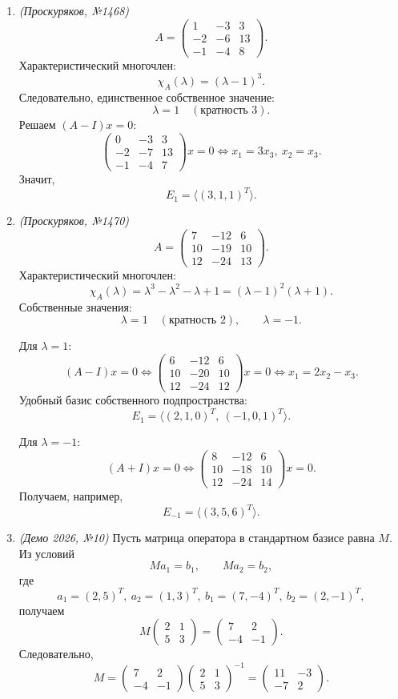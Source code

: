 \begin{enumerate}
\item \textit{(Проскуряков, №1468)}
\[
A=\begin{pmatrix}
1&-3&3\\
-2&-6&13\\
-1&-4&8
\end{pmatrix}.
\]
Характеристический многочлен:
\[
\chi_A(\lambda)=(\lambda-1)^3.
\]
Следовательно, единственное собственное значение:
\[
\lambda=1 \quad (\text{кратность }3).
\]
Решаем \((A-I)x=0\):
\[
\begin{pmatrix}
0&-3&3\\
-2&-7&13\\
-1&-4&7
\end{pmatrix}x=0
\iff x_1=3x_3,\ x_2=x_3.
\]
Значит,
\[
E_1=\langle (3,1,1)^T\rangle.
\]

\item \textit{(Проскуряков, №1470)}
\[
A=\begin{pmatrix}
7&-12&6\\
10&-19&10\\
12&-24&13
\end{pmatrix}.
\]
Характеристический многочлен:
\[
\chi_A(\lambda)=\lambda^3-\lambda^2-\lambda+1=(\lambda-1)^2(\lambda+1).
\]
Собственные значения:
\[
\lambda=1 \quad (\text{кратность }2),\qquad \lambda=-1.
\]

Для \(\lambda=1\):
\[
(A-I)x=0 \iff
\begin{pmatrix}
6&-12&6\\
10&-20&10\\
12&-24&12
\end{pmatrix}x=0
\iff x_1=2x_2-x_3.
\]
Удобный базис собственного подпространства:
\[
E_1=\langle (2,1,0)^T,\ (-1,0,1)^T\rangle.
\]

Для \(\lambda=-1\):
\[
(A+I)x=0 \iff
\begin{pmatrix}
8&-12&6\\
10&-18&10\\
12&-24&14
\end{pmatrix}x=0.
\]
Получаем, например,
\[
E_{-1}=\langle (3,5,6)^T\rangle.
\]

\item \textit{(Демо 2026, №10)}
Пусть матрица оператора в стандартном базисе равна \(M\). Из условий
\[
M a_1=b_1,\qquad M a_2=b_2,
\]
где
\[
a_1=(2,5)^T,\ a_2=(1,3)^T,\ b_1=(7,-4)^T,\ b_2=(2,-1)^T,
\]
получаем
\[
M\begin{pmatrix}2&1\\5&3\end{pmatrix}
=\begin{pmatrix}7&2\\-4&-1\end{pmatrix}.
\]
Следовательно,
\[
M=\begin{pmatrix}7&2\\-4&-1\end{pmatrix}
\begin{pmatrix}2&1\\5&3\end{pmatrix}^{-1}
=
\begin{pmatrix}11&-3\\-7&2\end{pmatrix}.
\]


\end{enumerate}
